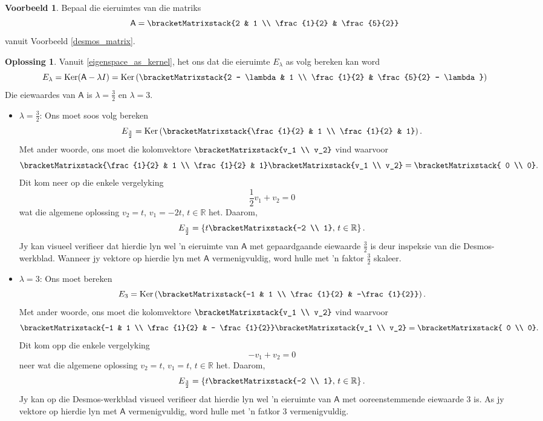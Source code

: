 \documentclass[a4paper,11pt]{book}
\theoremstyle{definition}
\newtheorem{example_environment}{Voorbeeld}[chapter]
\newtheorem*{solution}{Oplossing}
\newcommand{\mat}[1]{\mathsf{#1}}
\newcommand{\cmatrix}[1]{\bracketMatrixstack{#1}}
\newenvironment{example}
	{
		\begin{oframed}
		\begin{example_environment}
	}
	{
		\end{example_environment}
		\end{oframed}
	}
\DeclareMathOperator{\Ker}{Ker}
\begin{document}
\begin{example} \label{eigvectors_desmos_matrix} Bepaal die eieruimtes van
	die matriks
	\[
		\mat{A} = \cmatrix{2 & 1 \\ \frac{1}{2} & \frac{5}{2}}
	\]
	vanuit Voorbeeld \ref{desmos_matrix}.

	\begin{solution}
		Vanuit \eqref{eigenspace_as_kernel}, het ons dat die eieruimte
		$E_\lambda$ as volg bereken kan word
		\[
			E_\lambda = \Ker (\mat{A} - \lambda I) = \Ker \left( \cmatrix{2
			- \lambda & 1 \\ \frac{1}{2} & \frac{5}{2} - \lambda} \right)
		\]
		Die eiewaardes van $\mat{A}$ is $\lambda = \frac{3}{2}$ en $\lambda
		= 3$.

		\begin{itemize}

			\item $\lambda = \frac{3}{2}$:
				Ons moet soos volg bereken
				\[
					E_{\frac{3}{2}} = \Ker \left( \cmatrix{\frac{1}{2} & 1
					\\ \frac{1}{2} & 1} \right).
				\]
				Met ander woorde, ons moet die kolomvektore $\cmatrix{v_1
				\\ v_2}$  vind waarvoor
				\[
					\cmatrix{\frac{1}{2} & 1 \\ \frac{1}{2} & 1} \cmatrix{v_1 \\ v_2} = \cmatrix{ 0 \\ 0}.
				\]
				Dit kom neer op die enkele vergelyking
				\[
					\frac{1}{2}v_1 + v_2 = 0
				\]
				wat die algemene oplossing $v_2 = t$, $v_1 = -2t$, $t \in
				\mathbb{R}$ het. Daarom,
				\[
					E_{\frac{3}{2}} = \left\{ t \cmatrix{-2 \\ 1}, \, t \in
					\mathbb{R} \right\}.
				\]
				Jy kan visueel verifieer dat hierdie lyn wel 'n eieruimte
				van $\mat{A}$ met gepaardgaande eiewaarde $\frac{3}{2}$ is
				deur inspeksie van die Desmos-werkblad. Wanneer jy vektore
				op hierdie lyn met $\mat{A}$ vermenigvuldig, word hulle met
				'n faktor $\frac{3}{2}$ skaleer.

			\item $\lambda = 3$:
				Ons moet bereken
				\[
					E_3 = \Ker \left( \cmatrix{-1 & 1 \\ \frac{1}{2} &
					-\frac{1}{2}} \right).
				\]
				Met ander woorde, ons moet die kolomvektore $\cmatrix{v_1
				\\ v_2}$ vind waarvoor
				\[
					\cmatrix{-1 & 1 \\ \frac{1}{2} & - \frac{1}{2}}
					\cmatrix{v_1 \\ v_2} = \cmatrix{ 0 \\ 0}.
				\]
				Dit kom opp die enkele vergelyking 
				\[
					-v_1 + v_2 = 0
				\]
				neer wat die algemene oplossing $v_2 = t$, $v_1 = t$, $t
				\in \mathbb{R}$ het. Daarom,
				\[
					E_{\frac{3}{2}} = \left\{ t \cmatrix{-2 \\ 1}, \, t \in
					\mathbb{R} \right\}.
				\]
				Jy kan op die Desmos-werkblad visueel verifieer dat hierdie
				lyn wel 'n eieruimte van $\mat{A}$ met ooreenstemmende
				eiewaarde $3$ is. As jy vektore op hierdie lyn met
				$\mat{A}$ vermenigvuldig, word hulle met 'n fatkor $3$
				vermenigvuldig.


\end{itemize}
\end{solution}
\end{example}
\end{document}
